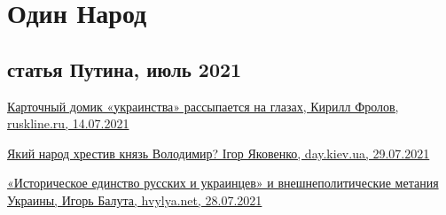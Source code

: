  
 
 
 
 
\chapter{Один Народ}

\section{статья Путина, июль 2021}


\href{https://ruskline.ru/news_rl/2021/07/14/kartochnyi_domik_ukrainstva_rassypaetsya_na_glazah}{%
Карточный домик «украинства» рассыпается на глазах, Кирилл Фролов, ruskline.ru, 14.07.2021%
}

\href{https://day.kyiv.ua/uk/blog/suspilstvo/yakyy-narod-hrestyv-knyaz-volodymyr}{%
Який народ хрестив князь Володимир? Ігор Яковенко, day.kiev.ua, 29.07.2021%
}

\href{https://analytics.hvylya.net/234637-istoricheskoe-edinstvo-russkih-i-ukraincev-i-vneshnepoliticheskie-metaniya-ukrainy}{%
«Историческое единство русских и украинцев» и внешнеполитические метания Украины, Игорь Балута, hvylya.net, 28.07.2021%
}
